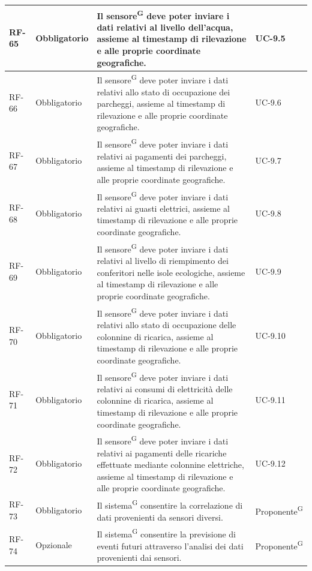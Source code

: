\documentclass[8pt]{article}
\newcommand{\glossterm}[1]{#1\textsuperscript{G}} %
\begin{document}
\begin{longtable}{|>{\centering\arraybackslash}p{1.2cm}|>{\centering\arraybackslash}p{2cm}|>{\centering\arraybackslash}p{8.5cm}|>{\centering\arraybackslash}p{3cm}|}
            RF-65 & Obbligatorio & Il \glossterm{sensore} deve poter inviare i dati relativi al livello dell'acqua, assieme al timestamp di rilevazione e alle proprie coordinate geografiche. & UC-9.5 \\ \hline
            RF-66 & Obbligatorio & Il \glossterm{sensore} deve poter inviare i dati relativi allo stato di occupazione dei parcheggi, assieme al timestamp di rilevazione e alle proprie coordinate geografiche. & UC-9.6 \\ \hline
            RF-67 & Obbligatorio & Il \glossterm{sensore} deve poter inviare i dati relativi ai pagamenti dei parcheggi, assieme al timestamp di rilevazione e alle proprie coordinate geografiche. & UC-9.7 \\ \hline
            RF-68 & Obbligatorio & Il \glossterm{sensore} deve poter inviare i dati relativi ai guasti elettrici, assieme al timestamp di rilevazione e alle proprie coordinate geografiche. & UC-9.8 \\ \hline
            RF-69 & Obbligatorio & Il \glossterm{sensore} deve poter inviare i dati relativi al livello di riempimento dei conferitori nelle isole ecologiche, assieme al timestamp di rilevazione e alle proprie coordinate geografiche. & UC-9.9 \\ \hline
            RF-70 & Obbligatorio & Il \glossterm{sensore} deve poter inviare i dati relativi allo stato di occupazione delle colonnine di ricarica, assieme al timestamp di rilevazione e alle proprie coordinate geografiche. & UC-9.10 \\ \hline
            RF-71 & Obbligatorio & Il \glossterm{sensore} deve poter inviare i dati relativi ai consumi di elettricità delle colonnine di ricarica, assieme al timestamp di rilevazione e alle proprie coordinate geografiche. & UC-9.11 \\ \hline
            RF-72 & Obbligatorio & Il \glossterm{sensore} deve poter inviare i dati relativi ai pagamenti delle ricariche effettuate mediante colonnine elettriche, assieme al timestamp di rilevazione e alle proprie coordinate geografiche. & UC-9.12 \\ \hline
            RF-73 & Obbligatorio & Il \glossterm{sistema} consentire la correlazione di dati provenienti da sensori diversi. & \glossterm{Proponente} \\ \hline
            RF-74 & Opzionale & Il \glossterm{sistema} consentire la previsione di eventi futuri attraverso l'analisi dei dati provenienti dai sensori. & \glossterm{Proponente} \\ \hline
\end{longtable}
\clearpage
\end{document}
